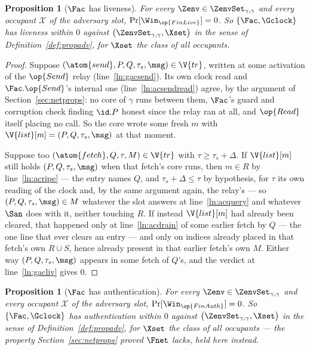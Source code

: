 \documentclass[10pt,oneside,openany]{book}
\theoremstyle{accentdef}
\theoremstyle{accentplain}
\newtheorem{proposition}[definition]{Proposition}
\begin{document}
\begin{proposition}[$\Fac$ has liveness]\label{prop:acliv}
For every $\Zenv \in \ZenvSet_{\gamma,\gamma}$ and every occupant $\mathcal{X}$ of the adversary
slot, $\Pr[\Win_{\op{FinLive}}] = 0$. So $\{\Fac,\Gclock\}$ has liveness within $0$ against
$\bigl(\ZenvSet_{\gamma,\gamma},\Xset\bigr)$ in the sense of Definition~\ref{def:propadv}, for
$\Xset$ the class of all occupants.
\end{proposition}

\begin{proof}
Suppose $(\atom{send},P,Q,\tau_s,\msg) \in \V{tr}$, written at some activation of the $\op{Send}$
relay (line~\ref{ln:gacsend}). Its own clock read and $\Fac.\op{Send}$'s internal one
(line~\ref{ln:acsendread}) agree, by the argument of Section~\ref{sec:netprops}: no core of
$\gamma$ runs between them, $\Fac$'s guard and corruption check finding $\id.P$ honest since the
relay ran at all, and $\op{Read}$ itself placing no call. So the core wrote some fresh $m$ with
$\V{list}[m] = (P,Q,\tau_s,\msg)$ at that moment.

Suppose too $(\atom{fetch},Q,\tau,M) \in \V{tr}$ with $\tau \geq \tau_s + \Delta$. If
$\V{list}[m]$ still holds $(P,Q,\tau_s,\msg)$ when that fetch's core runs, then $m \in R$ by
line~\ref{ln:acripe} --- the entry names $Q$, and $\tau_s + \Delta \leq \tau$ by hypothesis, for
$\tau$ its own reading of the clock and, by the same argument again, the relay's --- so
$(P,Q,\tau_s,\msg) \in M$ whatever the slot answers at line~\ref{ln:acquery} and whatever $\San$
does with it, neither touching $R$. If instead $\V{list}[m]$ had already been cleared, that
happened only at line~\ref{ln:acdrain} of some earlier fetch by $Q$ --- the one line that ever
clears an entry --- and only on indices already placed in that fetch's own $R \cup S$, hence
already present in that earlier fetch's own $M$. Either way $(P,Q,\tau_s,\msg)$ appears in some
fetch of $Q$'s, and the verdict at line~\ref{ln:gacliv} gives $0$.
\end{proof}

\begin{proposition}[$\Fac$ has authentication]\label{prop:acauth}
For every $\Zenv \in \ZenvSet_{\gamma,\gamma}$ and every occupant $\mathcal{X}$ of the adversary
slot, $\Pr[\Win_{\op{FinAuth}}] = 0$. So $\{\Fac,\Gclock\}$ has authentication within $0$ against
$\bigl(\ZenvSet_{\gamma,\gamma},\Xset\bigr)$ in the sense of Definition~\ref{def:propadv}, for
$\Xset$ the class of all occupants --- the property Section~\ref{sec:netprops} proved $\Fnet$
lacks, held here instead.
\end{proposition}
\end{document}
